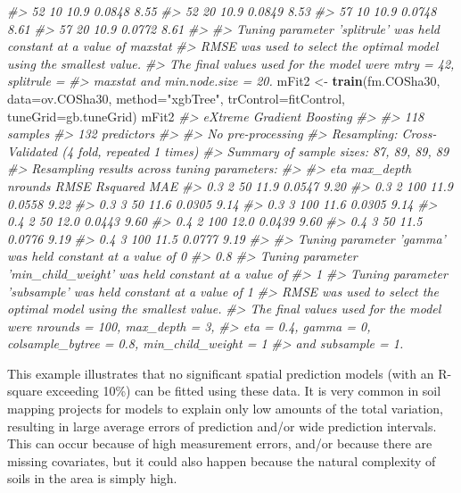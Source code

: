 \documentclass[graybox,natbib,nospthms,UStrade]{svmono}
\newenvironment{Shaded}{\begin{snugshade}}{\end{snugshade}}
\newcommand{\CommentTok}[1]{\textcolor[rgb]{0.37,0.37,0.37}{\textit{#1}}}
\newcommand{\DataTypeTok}[1]{\textcolor[rgb]{0.27,0.27,0.27}{#1}}
\newcommand{\KeywordTok}[1]{\textcolor[rgb]{0.27,0.27,0.27}{\textbf{#1}}}
\newcommand{\NormalTok}[1]{#1}
\newcommand{\StringTok}[1]{\textcolor[rgb]{0.5,0.5,0.5}{#1}}
\begin{document}
\begin{Shaded}
\begin{Highlighting}[]
\CommentTok{#>   52    10             10.9  0.0848    8.55}
\CommentTok{#>   52    20             10.9  0.0849    8.53}
\CommentTok{#>   57    10             10.9  0.0748    8.61}
\CommentTok{#>   57    20             10.9  0.0772    8.61}
\CommentTok{#> }
\CommentTok{#> Tuning parameter 'splitrule' was held constant at a value of maxstat}
\CommentTok{#> RMSE was used to select the optimal model using the smallest value.}
\CommentTok{#> The final values used for the model were mtry = 42, splitrule =}
\CommentTok{#>  maxstat and min.node.size = 20.}
\NormalTok{mFit2 <-}\StringTok{ }\KeywordTok{train}\NormalTok{(fm.COSha30, }\DataTypeTok{data=}\NormalTok{ov.COSha30, }\DataTypeTok{method=}\StringTok{"xgbTree"}\NormalTok{, }
               \DataTypeTok{trControl=}\NormalTok{fitControl, }\DataTypeTok{tuneGrid=}\NormalTok{gb.tuneGrid)}
\NormalTok{mFit2}
\CommentTok{#> eXtreme Gradient Boosting }
\CommentTok{#> }
\CommentTok{#> 118 samples}
\CommentTok{#> 132 predictors}
\CommentTok{#> }
\CommentTok{#> No pre-processing}
\CommentTok{#> Resampling: Cross-Validated (4 fold, repeated 1 times) }
\CommentTok{#> Summary of sample sizes: 87, 89, 89, 89 }
\CommentTok{#> Resampling results across tuning parameters:}
\CommentTok{#> }
\CommentTok{#>   eta  max_depth  nrounds  RMSE  Rsquared  MAE }
\CommentTok{#>   0.3  2           50      11.9  0.0547    9.20}
\CommentTok{#>   0.3  2          100      11.9  0.0558    9.22}
\CommentTok{#>   0.3  3           50      11.6  0.0305    9.14}
\CommentTok{#>   0.3  3          100      11.6  0.0305    9.14}
\CommentTok{#>   0.4  2           50      12.0  0.0443    9.60}
\CommentTok{#>   0.4  2          100      12.0  0.0439    9.60}
\CommentTok{#>   0.4  3           50      11.5  0.0776    9.19}
\CommentTok{#>   0.4  3          100      11.5  0.0777    9.19}
\CommentTok{#> }
\CommentTok{#> Tuning parameter 'gamma' was held constant at a value of 0}
\CommentTok{#>  0.8}
\CommentTok{#> Tuning parameter 'min_child_weight' was held constant at a value of}
\CommentTok{#>  1}
\CommentTok{#> Tuning parameter 'subsample' was held constant at a value of 1}
\CommentTok{#> RMSE was used to select the optimal model using the smallest value.}
\CommentTok{#> The final values used for the model were nrounds = 100, max_depth = 3,}
\CommentTok{#>  eta = 0.4, gamma = 0, colsample_bytree = 0.8, min_child_weight = 1}
\CommentTok{#>  and subsample = 1.}
\end{Highlighting}
\end{Shaded}

This example illustrates that no significant spatial prediction models (with an R-square exceeding 10\%) can be fitted using these data. It is very common in soil mapping projects for models to explain only low amounts of the total variation, resulting in large average errors of prediction and/or wide prediction intervals. This can occur because of high measurement errors, and/or because there are missing covariates, but it could also happen because the natural complexity of soils in the area is simply high.
\end{document}
